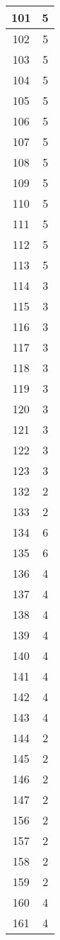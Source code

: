 \documentclass[letterpaper, 12pt]{article}
\begin{document}
\begin{longtable}{|c|c|}
\hline
101 & 5 \\
\hline
102 & 5 \\
\hline
103 & 5 \\
\hline
104 & 5 \\
\hline
105 & 5 \\
\hline
106 & 5 \\
\hline
107 & 5 \\
\hline
108 & 5 \\
\hline
109 & 5 \\
\hline
110 & 5 \\
\hline
111 & 5 \\
\hline
112 & 5 \\
\hline
113 & 5 \\
\hline
114 & 3 \\
\hline
115 & 3 \\
\hline
116 & 3 \\
\hline
117 & 3 \\
\hline
118 & 3 \\
\hline
119 & 3 \\
\hline
120 & 3 \\
\hline
121 & 3 \\
\hline
122 & 3 \\
\hline
123 & 3 \\
\hline
132 & 2 \\
\hline
133 & 2 \\
\hline
134 & 6 \\
\hline
135 & 6 \\
\hline
136 & 4 \\
\hline
137 & 4 \\
\hline
138 & 4 \\
\hline
139 & 4 \\
\hline
140 & 4 \\
\hline
141 & 4 \\
\hline
142 & 4 \\
\hline
143 & 4 \\
\hline
144 & 2 \\
\hline
145 & 2 \\
\hline
146 & 2 \\
\hline
147 & 2 \\
\hline
156 & 2 \\
\hline
157 & 2 \\
\hline
158 & 2 \\
\hline
159 & 2 \\
\hline
160 & 4 \\
\hline
161 & 4 \\

\end{longtable}
\end{document}
